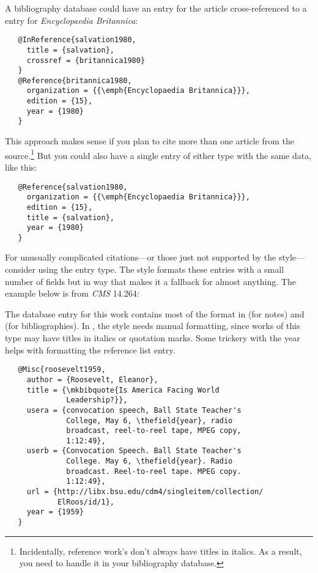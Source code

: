 \documentclass[11pt,letterpaper,oneside]{article}
\begin{document}
A bibliography database could have an  entry for
the article cross-referenced to a  entry for
\textit{Encyclopaedia Britannica}:

\begin{verbatim}
   @InReference{salvation1980,
     title = {salvation},
     crossref = {britannica1980}
   }
   @Reference{britannica1980,
     organization = {{\emph{Encyclopaedia Britannica}}},
     edition = {15},
     year = {1980}
   }
\end{verbatim}

\noindent This approach makes sense if you plan to cite more than one
article from the source.\footnote{Incidentally, reference work's don't
always have titles in italics. As a result, you need to handle it in
your bibliography database.} But you could also have a single entry of
either type with the same data, like this:

\begin{verbatim}
   @Reference{salvation1980,
     organization = {{\emph{Encyclopaedia Britannica}}},
     edition = {15},
     title = {salvation},
     year = {1980}
   }
\end{verbatim}

For unusually complicated ci\-ta\-tions---or those just not supported
by the style---consider using the  entry type. The style
formats these entries with a small number of fields but in way that
makes it a fallback for almost anything. The example below is from
\textit{CMS} 14.264:

\begin{citebib}
\item \cite{roosevelt1959}
\end{citebib}

\noindent The database entry for this work contains most of the format
in  (for notes) and  (for
bibliographies). In , the style needs manual
formatting, since works of this type may have titles in italics or
quotation marks. Some trickery with the year helps with formatting the
reference list entry.

\begin{verbatim}
   @Misc{roosevelt1959,
     author = {Roosevelt, Eleanor},
     title = {\mkbibquote{Is America Facing World
              Leadership?}},
     usera = {convocation speech, Ball State Teacher's
              College, May 6, \thefield{year}, radio
              broadcast, reel-to-reel tape, MPEG copy,
              1:12:49},
     userb = {Convocation Speech. Ball State Teacher's
              College. May 6, \thefield{year}. Radio
              broadcast. Reel-to-reel tape. MPEG copy.
              1:12:49},
     url = {http://libx.bsu.edu/cdm4/singleitem/collection/
            ElRoos/id/1},
     year = {1959}
   }
\end{verbatim}
\end{document}
